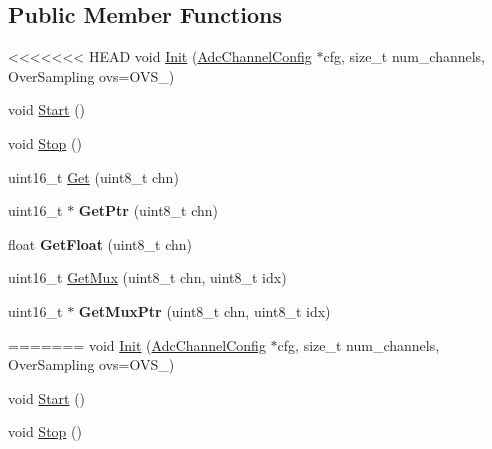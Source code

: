 \subsection*{Public Member Functions}
\begin{DoxyCompactItemize}
\item 
<<<<<<< HEAD
void \hyperlink{classdaisy_1_1_adc_handle_ab93340170ed44feced69fcdafc6c13ed}{Init} (\hyperlink{structdaisy_1_1_adc_channel_config}{Adc\+Channel\+Config} $\ast$cfg, size\+\_\+t num\+\_\+channels, Over\+Sampling ovs=O\+V\+S\+\_)
\item 
void \hyperlink{classdaisy_1_1_adc_handle_a6fddddc75eb2d4ba0365a68d4bac2bd3}{Start} ()
\item 
void \hyperlink{classdaisy_1_1_adc_handle_ab6a016e484c9b7389e6302521e778bc9}{Stop} ()
\item 
uint16\+\_\+t \hyperlink{classdaisy_1_1_adc_handle_a48bd9dd7c3aed8c38bbd2d481bd64438}{Get} (uint8\+\_\+t chn)
\item 
\mbox{\label{classdaisy_1_1_adc_handle_abb534f3a38da745ca6afa22a46d86638}} 
uint16\+\_\+t $\ast$ {\bfseries Get\+Ptr} (uint8\+\_\+t chn)
\item 
\mbox{\label{classdaisy_1_1_adc_handle_acf38cb16b28d6a8cbcc52945411ad465}} 
float {\bfseries Get\+Float} (uint8\+\_\+t chn)
\item 
uint16\+\_\+t \hyperlink{classdaisy_1_1_adc_handle_ac77bcec5738d2ebdd47a8bddbc3d944c}{Get\+Mux} (uint8\+\_\+t chn, uint8\+\_\+t idx)
\item 
\mbox{\label{classdaisy_1_1_adc_handle_a40be8eb26473465c1601999dc9561a0f}} 
uint16\+\_\+t $\ast$ {\bfseries Get\+Mux\+Ptr} (uint8\+\_\+t chn, uint8\+\_\+t idx)
\item 
\mbox{\label{classdaisy_1_1_adc_handle_a68be2402342491d2d636b34784870b56}} 
=======
void \hyperlink{classdaisy_1_1_adc_handle_ab518149ca03a1dda0273dab1afd74ac6}{Init} (\hyperlink{structdaisy_1_1_adc_channel_config}{Adc\+Channel\+Config} $\ast$cfg, size\+\_\+t num\+\_\+channels, Over\+Sampling ovs=O\+V\+S\+\_)
\item 
void \hyperlink{classdaisy_1_1_adc_handle_aef1669d0f168bd10ca94f6e540f31fe1}{Start} ()
\item 
void \hyperlink{classdaisy_1_1_adc_handle_a4a5e05d15b1f26ce80e997c75fb5d3dc}{Stop} ()

\end{DoxyCompactItemize}
